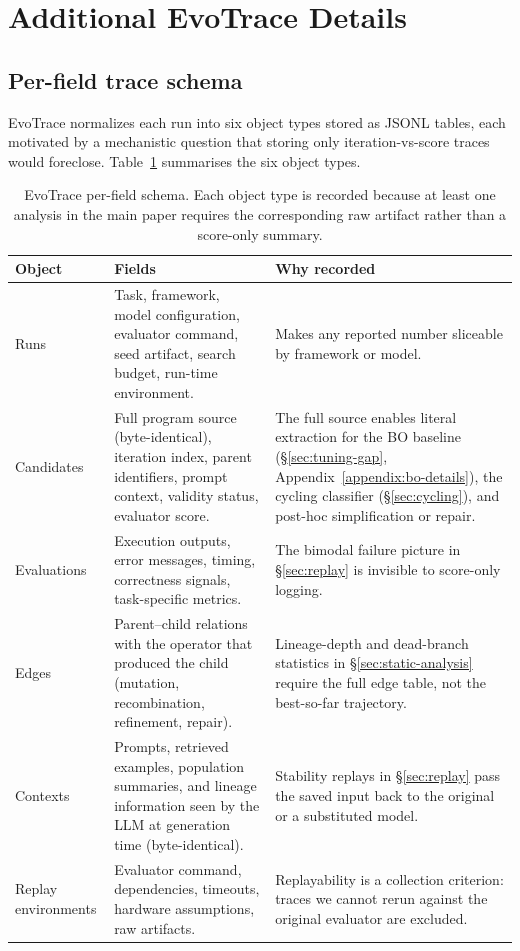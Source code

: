 \appendix

\section{Additional EvoTrace Details}
\label{appendix:evotrace-details}

\subsection{Per-field trace schema}
\label{appendix:trace-schema}

EvoTrace normalizes each run into six object types stored as JSONL tables, each motivated by a mechanistic question that storing only iteration-vs-score traces would foreclose. Table~\ref{tab:trace-schema} summarises the six object types.

\begin{table}[h]
\centering
\caption{EvoTrace per-field schema. Each object type is recorded because at least one analysis in the main paper requires the corresponding raw artifact rather than a score-only summary.}
\label{tab:trace-schema}
\small
\setlength{\tabcolsep}{6pt}
\renewcommand{\arraystretch}{1.25}
\begin{tabular}{@{}l p{4.6cm} p{6.0cm}@{}}
\toprule
\textbf{Object} & \textbf{Fields} & \textbf{Why recorded} \\
\midrule
Runs &
Task, framework, model configuration, evaluator command, seed artifact, search budget, run-time environment. &
Makes any reported number sliceable by framework or model. \\
Candidates &
Full program source (byte-identical), iteration index, parent identifiers, prompt context, validity status, evaluator score. &
The full source enables literal extraction for the BO baseline (\S\ref{sec:tuning-gap}, Appendix~\ref{appendix:bo-details}), the cycling classifier (\S\ref{sec:cycling}), and post-hoc simplification or repair. \\
Evaluations &
Execution outputs, error messages, timing, correctness signals, task-specific metrics. &
The bimodal failure picture in \S\ref{sec:replay} is invisible to score-only logging. \\
Edges &
Parent--child relations with the operator that produced the child (mutation, recombination, refinement, repair). &
Lineage-depth and dead-branch statistics in \S\ref{sec:static-analysis} require the full edge table, not the best-so-far trajectory. \\
Contexts &
Prompts, retrieved examples, population summaries, and lineage information seen by the LLM at generation time (byte-identical). &
Stability replays in \S\ref{sec:replay} pass the saved input back to the original or a substituted model. \\
Replay environments &
Evaluator command, dependencies, timeouts, hardware assumptions, raw artifacts. &
Replayability is a collection criterion: traces we cannot rerun against the original evaluator are excluded. \\
\bottomrule
\end{tabular}
\end{table}

